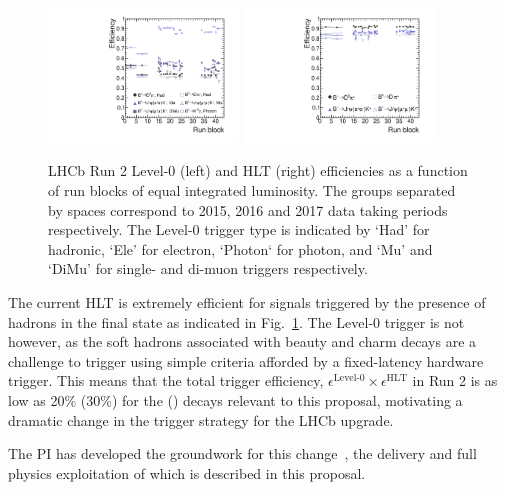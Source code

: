 \documentclass[11pt,a4paper]{article}
\begin{document}
\begin{figure}
    \centering
    \includegraphics[width=0.45\textwidth]{figs/L0Eff_Beauty_RUN.pdf}
    \includegraphics[width=0.45\textwidth]{figs/HLT2TotalEff_Beauty_RUN.pdf}
    \caption{LHCb Run 2 Level-0 (left) and HLT (right) efficiencies as a function of run blocks of equal integrated luminosity. The groups separated by spaces correspond to 2015, 2016 and 2017 data taking periods respectively. The Level-0 trigger type is indicated by `Had' for hadronic, `Ele' for electron, `Photon` for photon, and `Mu' and `DiMu' for single- and di-muon triggers respectively.}
    \label{fig:trigger}
\end{figure}
 
The current HLT is extremely efficient for signals triggered by the presence of hadrons in the final state as indicated in Fig.~\ref{fig:trigger}. The Level-0 trigger is not however, as the soft hadrons associated with beauty and charm decays are a challenge to trigger using simple criteria afforded by a fixed-latency hardware trigger. This means that the total trigger efficiency, $\epsilon^{\text{Level-0}}\times\epsilon^{\text{HLT}}$ in Run 2 is as low as 20\% (30\%) for the \HepProcess{\PB\to\PD\PD} () decays relevant to this proposal, motivating a dramatic change in the trigger strategy for the LHCb upgrade.

The PI has developed the groundwork for this change~\cite{LHCb-PUB-2014-027,LHCb-PUB-2014-040,CERN-LHCC-2014-016}, the delivery and full physics exploitation of which is described in this proposal. 
 
\end{document}
